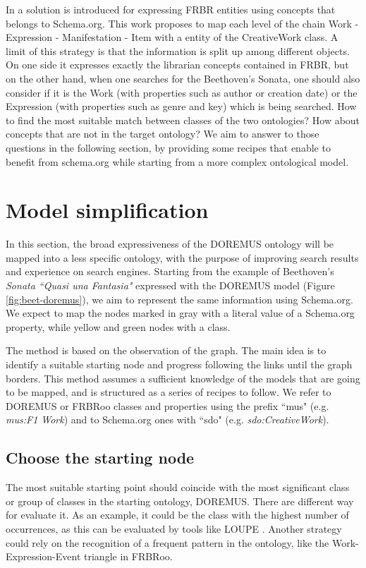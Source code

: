 \documentclass{llncs}
\begin{document}
In \cite{godby2013relationship} a solution is introduced for expressing FRBR entities using concepts that belongs to Schema.org. This work proposes to map each level of the chain Work - Expression - Manifestation - Item with a entity of the CreativeWork class. A limit of this strategy is that the information is split up among different objects. On one side it expresses exactly the librarian concepts contained in FRBR, but on the other hand, when one searches for the Beethoven's Sonata, one should also consider if it is the Work (with properties such as author or creation date) or the Expression (with properties such as genre and key) which is being searched. How to find the most suitable match between classes of the two ontologies? How about concepts that are not in the target ontology? We aim to answer to those questions in the following section, by providing some recipes that enable to benefit from schema.org while starting from a more complex ontological model.


\section{Model simplification}
\label{sec:simplification}
In this section, the broad expressiveness of the DOREMUS ontology will be mapped into a less specific ontology, with the purpose of improving search results and experience on search engines. Starting from the example of Beethoven's \textit{Sonata ``Quasi una Fantasia"} expressed with the DOREMUS model (Figure \ref{fig:beet-doremus}), we aim to represent the same information using Schema.org. We expect to map the nodes marked in gray with a literal value of a Schema.org property, while yellow and green nodes with a class.

The method is based on the observation of the graph. The main idea is to identify a suitable starting node and progress following the links until the graph borders. This method assumes a sufficient knowledge of the models that are going to be mapped, and is structured as a series of recipes to follow. We refer to DOREMUS or FRBRoo classes and properties using the prefix ``mus" (e.g. \textit{mus:F1 Work}) and to Schema.org ones with ``sdo" (e.g. \textit{sdo:CreativeWork}).

\subsection{Choose the starting node}
The most suitable starting point should coincide with the most significant class or group of classes in the starting ontology, DOREMUS. There are different way for evaluate it. As an example, it could be the class with the highest number of occurrences, as this can be evaluated by tools like LOUPE \cite{mihindukulasooriya2015loupe}. Another strategy could rely on the recognition of a frequent pattern in the ontology, like the Work-Expression-Event triangle in FRBRoo.
\end{document}
